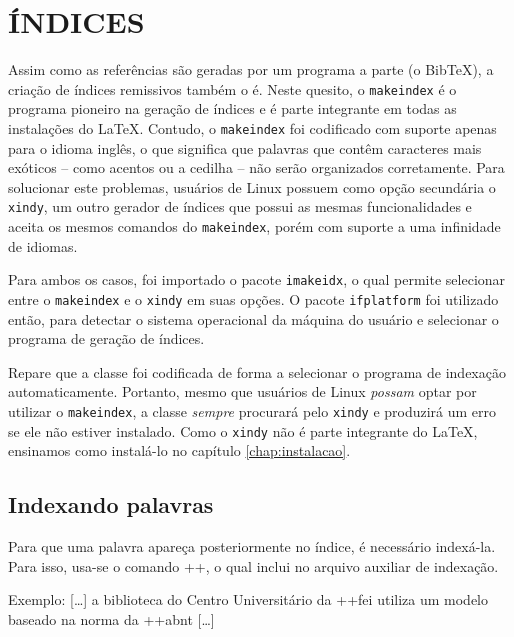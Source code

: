 \documentclass{fei}
\begin{document}
	\chapter{ÍNDICES}\label{chap:indice}
	
	Assim como as referências são geradas por um programa a parte (o Bib\TeX), a criação de índices remissivos também o é. Neste quesito, o \texttt{makeindex} é o programa pioneiro na geração de índices e é parte integrante em todas as instalações do \LaTeX. Contudo, o \texttt{makeindex} foi codificado com suporte apenas para o idioma inglês, o que significa que palavras que contêm caracteres mais exóticos -- como acentos ou a cedilha -- não serão organizados corretamente. Para solucionar este problemas, usuários de Linux possuem como opção secundária o \texttt{xindy}, um outro gerador de índices que possui as mesmas funcionalidades e aceita os mesmos comandos do \texttt{makeindex}, porém com suporte a uma infinidade de idiomas.
	
	Para ambos os casos, foi importado o pacote \texttt{imakeidx}, o qual permite selecionar entre o \texttt{makeindex} e o \texttt{xindy} em suas opções. O pacote \texttt{ifplatform} foi utilizado então, para detectar o sistema operacional da máquina do usuário e selecionar o programa de geração de índices.
	
	Repare que a classe foi codificada de forma a selecionar o programa de indexação automaticamente. Portanto, mesmo que usuários de Linux \emph{possam} optar por utilizar o \texttt{makeindex}, a classe \emph{sempre} procurará pelo \texttt{xindy} e produzirá um erro se ele não estiver instalado. Como o \texttt{xindy} não é parte integrante do \LaTeX, ensinamos como instalá-lo no capítulo \ref{chap:instalacao}.
	
	\section{Indexando palavras}
	
	Para que uma palavra apareça posteriormente no índice, é necessário indexá-la. Para isso, usa-se o comando \latexinline++, o qual inclui  no arquivo auxiliar de indexação.

	Exemplo: [\ldots] a biblioteca do Centro Universitário da \latexinline++\gls{fei} utiliza um modelo baseado na norma da \latexinline++\gls{abnt} [\ldots]
	
\end{document}
